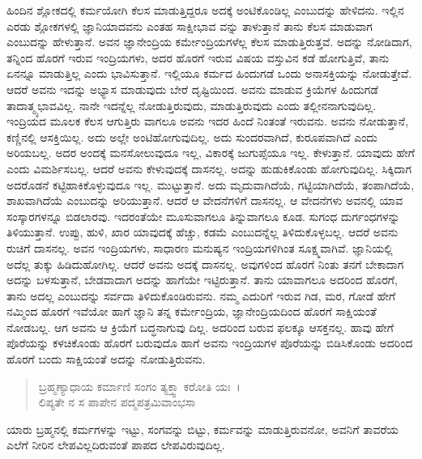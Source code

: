 ಹಿಂದಿನ ಶ್ಲೋಕದಲ್ಲಿ ಕರ್ಮಯೋಗಿ ಕೆಲಸ ಮಾಡುತ್ತಿದ್ದರೂ ಅದಕ್ಕೆ ಅಂಟಿಕೊಂಡಿಲ್ಲ ಎಂಬುದನ್ನು ಹೇಳಿದನು. ಇಲ್ಲಿನ ಎರಡು ಶ್ಲೋಕಗಳಲ್ಲಿ ಜ್ಞಾನಿಯಾದವನು ಎಂತಹ ಸಾಕ್ಷೀಭಾವ ವನ್ನು ತಾಳುತ್ತಾನೆ ತಾನು ಕೆಲಸ ಮಾಡುವಾಗ ಎಂಬುದನ್ನು ಹೇಳುತ್ತಾನೆ. ಅವನ ಜ್ಞಾನೇಂದ್ರಿಯ ಕರ್ಮೇಂದ್ರಿಯಗಳೆಲ್ಲ ಕೆಲಸ ಮಾಡುತ್ತಿರುತ್ತವೆ. ಅದನ್ನು ನೋಡಿದಾಗ, ತನ್ನಿಂದ ಹೊರಗೆ ಇರುವ ಇಂದ್ರಿಯಗಳು, ಅದರ ಹೊರಗೆ ಇರುವ ವಿಷಯ ವಸ್ತುವಿನ ಕಡೆ ಹೋಗುತ್ತಿವೆ, ತಾನು ಏನನ್ನೂ ಮಾಡುತ್ತಿಲ್ಲ ಎಂದು ಭಾವಿಸುತ್ತಾನೆ. ಇಲ್ಲಿಯೂ ಕರ್ಮದ ಹಿಂದುಗಡೆ ಒಂದು ಅನಾಸಕ್ತಿಯನ್ನು ನೋಡುತ್ತೇವೆ. ಆದರೆ ಅವನು ಇದನ್ನು ಅಭ್ಯಾಸ ಮಾಡುವುದು ಬೇರೆ ದೃಷ್ಟಿಯಿಂದ. ಅವನು ಮಾಡುವ ಕ್ರಿಯೆಗಳ ಹಿಂದುಗಡೆ ತಾದಾತ್ಮ್ಯಭಾವವಿಲ್ಲ. ನಾನೇ ಇದನ್ನೆಲ್ಲ ನೋಡುತ್ತಿರುವುದು, ಮಾಡುತ್ತಿರುವುದು ಎಂದು ತಲ್ಲೀನನಾಗುವುದಿಲ್ಲ. ಇಂದ್ರಿಯದ ಮೂಲಕ ಕೆಲಸ ಆಗುತ್ತಿರು ವಾಗಲೂ ಅವನು ಇದರ ಹಿಂದೆ ನಿಂತಂತೆ ಇರುವನು. ಅವನು ನೋಡುತ್ತಾನೆ, ಕಣ್ಣಿನಲ್ಲಿ ಆಸಕ್ತಿಯಿಲ್ಲ. ಅದು ಅಲ್ಲೇ ಅಂಟಿಹೋಗುವುದಿಲ್ಲ. ಅದು ಸುಂದರವಾಗಿದೆ, ಕುರೂಪವಾಗಿದೆ ಎಂದು ಅರಿಯಬಲ್ಲ. ಅದರ ಅಂದಕ್ಕೆ ಮನಸೋಲುವುದೂ ಇಲ್ಲ, ವಿಕಾರಕ್ಕೆ ಜುಗುಪ್ಸೆಯೂ ಇಲ್ಲ. ಕೇಳುತ್ತಾನೆ. ಯಾವುದು ಹೇಗೆ ಎಂದು ವಿಮರ್ಶಿಸಬಲ್ಲ. ಆದರೆ ಅವನು ಕೇಳುವುದಕ್ಕೆ ದಾಸನಲ್ಲ. ಅದನ್ನು ಹುಡುಕಿಕೊಂಡು ಹೋಗುವುದಿಲ್ಲ. ಸಿಕ್ಕಿದಾಗ ಅದರೊಡನೆ ಕಟ್ಟಿಹಾಕಿಕೊಳ್ಳುವುದೂ ಇಲ್ಲ. ಮುಟ್ಟುತ್ತಾನೆ. ಅದು ಮೃದುವಾಗಿದೆಯೆ, ಗಟ್ಟಿಯಾಗಿದೆಯೆ, ತಂಪಾಗಿದೆಯೆ, ಶಾಖವಾಗಿದೆಯೆ ಎಂಬುದನ್ನು ಅರಿಯುತ್ತಾನೆ. ಆದರೆ ಆ ವೇದನೆಗಳಿಗೆ ದಾಸನಲ್ಲ. ಆ ವೇದನೆಗಳು ಅವನಲ್ಲಿ ಯಾವ ಸಂಸ್ಕಾರಗಳನ್ನೂ ಬಿಡಲಾರವು. ಇದರಂತೆಯೇ ಮೂಸುವಾಗಲೂ ತಿನ್ನುವಾಗಲೂ ಕೂಡ. ಸುಗಂಧ ದುರ್ಗಂಧಗಳನ್ನು ತಿಳಿಯುತ್ತಾನೆ. ಉಪ್ಪು, ಹುಳಿ, ಖಾರ ಯಾವುದಕ್ಕೆ ಹೆಚ್ಚು, ಕಡಮೆ ಎಂಬುದನ್ನೆಲ್ಲ ತಿಳಿದುಕೊಳ್ಳಬಲ್ಲ. ಆದರೆ ಅವನು ರುಚಿಗೆ ದಾಸನಲ್ಲ. ಅವನ ಇಂದ್ರಿಯಗಳು, ಸಾಧಾರಣ ಮನುಷ್ಯನ ಇಂದ್ರಿಯಗಳಿಗಿಂತ ಸೂಕ್ಷ್ಮವಾಗಿವೆ. ಜ್ಞಾನಿಯಲ್ಲಿ ಅದೆಲ್ಲ ತುಕ್ಕು ಹಿಡಿದುಹೋಗಿಲ್ಲ. ಆದರೆ ಅವನು ಅದಕ್ಕೆ ದಾಸನಲ್ಲ. ಅವುಗಳಿಂದ ಹೊರಗೆ ನಿಂತು ತನಗೆ ಬೇಕಾದಾಗ ಅದನ್ನು ಬಳಸುತ್ತಾನೆ, ಬೇಡವಾದಾಗ ಅದನ್ನು ಹಾಗೆಯೇ ಇಟ್ಟಿರುತ್ತಾನೆ. ತಾನು ಯಾವಾಗಲೂ ಅದರಿಂದ ಹೊರಗೆ, ತಾನು ಅದಲ್ಲ ಎಂಬುದನ್ನು ಸರ್ವದಾ ತಿಳಿದುಕೊಂಡಿರುವನು. ನಮ್ಮ ಎದುರಿಗೆ ಇರುವ ಗಿಡ, ಮರ, ಗೋಡೆ ಹೇಗೆ ನಮ್ಮಿಂದ ಹೊರಗೆ ಇವೆಯೋ ಹಾಗೆ ಜ್ಞಾನಿ ತನ್ನ ಕರ್ಮೇಂದ್ರಿಯ, ಜ್ಞಾನೇಂದ್ರಿಯದಿಂದ ಹೊರಗೆ ಸಾಕ್ಷಿಯಂತೆ ನೋಡಬಲ್ಲ. ಆಗ ಅವನು ಆ ಕ್ರಿಯೆಗೆ ಬದ್ಧನಾಗುವು ದಿಲ್ಲ. ಅದರಿಂದ ಬರುವ ಫಲಕ್ಕೂ ಆಸಕ್ತನಲ್ಲ. ಹಾವು ಹೇಗೆ ಪೊರೆಯನ್ನು ಕಳಚಿಕೊಂಡು ಹೊರಗೆ ಬರುವುದೊ ಹಾಗೆ ಅವನು ಇಂದ್ರಿಯಗಳ ಪೊರೆಯನ್ನು ಬಿಡಿಸಿಕೊಂಡು ಅದರಿಂದ ಹೊರಗೆ ಬಂದು ಸಾಕ್ಷಿಯಂತೆ ಅದನ್ನು ನೋಡುತ್ತಿರುವನು.

\begin{verse}
ಬ್ರಹ್ಮಣ್ಯಾಧಾಯ ಕರ್ಮಾಣಿ ಸಂಗಂ ತ್ಯಕ್ತ್ವಾ ಕರೋತಿ ಯಃ~।\\ಲಿಪ್ಯತೇ ನ ಸ ಪಾಪೇನ ಪದ್ಮಪತ್ರಮಿವಾಂಭಸಾ 
\end{verse}

{\small ಯಾರು ಬ್ರಹ್ಮನಲ್ಲಿ ಕರ್ಮಗಳನ್ನು ಇಟ್ಟು, ಸಂಗವನ್ನು ಬಿಟ್ಟು, ಕರ್ಮವನ್ನು ಮಾಡುತ್ತಿರುವನೋ, ಅವನಿಗೆ ತಾವರೆಯ ಎಲೆಗೆ ನೀರಿನ ಲೇಪವಿಲ್ಲದಿರುವಂತೆ ಪಾಪದ ಲೇಪವಿರುವುದಿಲ್ಲ.}

